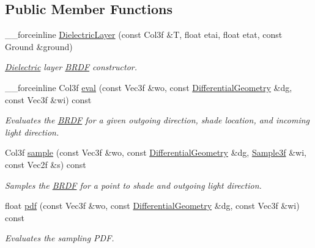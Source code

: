 \subsection*{Public Member Functions}
\begin{DoxyCompactItemize}
\item 
\_\-\_\-forceinline \hyperlink{classembree_1_1_dielectric_layer_a1736360a46c1caf85a837437507865eb}{DielectricLayer} (const Col3f \&T, float etai, float etat, const Ground \&ground)
\begin{DoxyCompactList}\small\item\em \hyperlink{classembree_1_1_dielectric}{Dielectric} layer \hyperlink{classembree_1_1_b_r_d_f}{BRDF} constructor. \item\end{DoxyCompactList}\item 
\_\-\_\-forceinline Col3f \hyperlink{classembree_1_1_dielectric_layer_ac96b3520055e55d2bc51e49cbd3c1d57}{eval} (const Vec3f \&wo, const \hyperlink{structembree_1_1_differential_geometry}{DifferentialGeometry} \&dg, const Vec3f \&wi) const 
\begin{DoxyCompactList}\small\item\em Evaluates the \hyperlink{classembree_1_1_b_r_d_f}{BRDF} for a given outgoing direction, shade location, and incoming light direction. \item\end{DoxyCompactList}\item 
Col3f \hyperlink{classembree_1_1_dielectric_layer_a33f32f84f98c85a68a212b8b6362e7e1}{sample} (const Vec3f \&wo, const \hyperlink{structembree_1_1_differential_geometry}{DifferentialGeometry} \&dg, \hyperlink{structembree_1_1_sample}{Sample3f} \&wi, const Vec2f \&s) const 
\begin{DoxyCompactList}\small\item\em Samples the \hyperlink{classembree_1_1_b_r_d_f}{BRDF} for a point to shade and outgoing light direction. \item\end{DoxyCompactList}\item 
float \hyperlink{classembree_1_1_dielectric_layer_abd4cc5987cccc0c505d30f306c2e145b}{pdf} (const Vec3f \&wo, const \hyperlink{structembree_1_1_differential_geometry}{DifferentialGeometry} \&dg, const Vec3f \&wi) const 
\begin{DoxyCompactList}\small\item\em Evaluates the sampling PDF. \item\end{DoxyCompactList}\end{DoxyCompactItemize}


